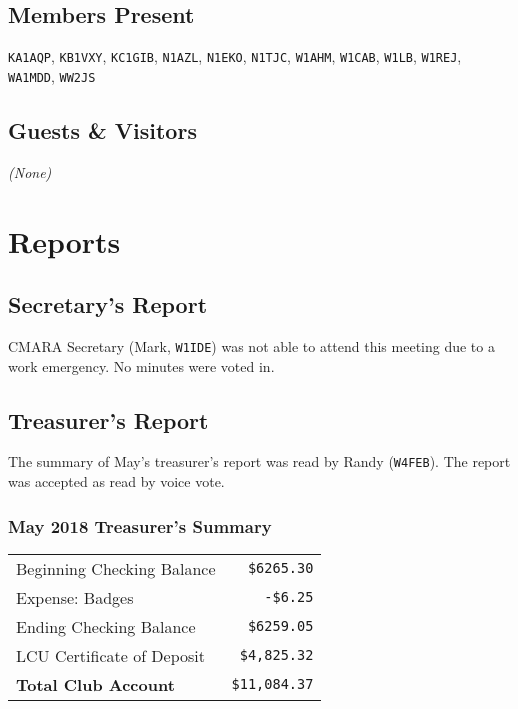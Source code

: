 \documentclass[10pt,letterpaper]{article}
\begin{document}
\subsection{Members Present}
\texttt{KA1AQP},
\texttt{KB1VXY},
\texttt{KC1GIB},
\texttt{N1AZL},
\texttt{N1EKO},
\texttt{N1TJC},
\texttt{W1AHM},
\texttt{W1CAB},
\texttt{W1LB},
\texttt{W1REJ},
\texttt{WA1MDD},
\texttt{WW2JS}

\subsection{Guests \& Visitors}
\emph{(None)}


\section{Reports}

\subsection{Secretary's Report}
CMARA Secretary (Mark, \texttt{W1IDE}) was not able to attend this meeting due to a work emergency. No minutes were voted in.

\newpage
\subsection{Treasurer's Report}
The summary of May's treasurer's report was read by Randy (\texttt{W4FEB}). The report was accepted as read by voice vote.

\subsubsection{May 2018 Treasurer's Summary}
\noindent
\begin{tabular}{|l|r|}
  \hline
  Beginning Checking Balance & \texttt{\$6265.30} \\
  Expense: Badges & \texttt{-\$6.25} \\
  Ending Checking Balance & \texttt{\$6259.05} \\
  \hline
  \hline
  LCU Certificate of Deposit & \texttt{\$4,825.32} \\
  \hline
  \hline
  \textbf{Total Club Account} & \texttt{\$11,084.37} \\
  \hline
\end{tabular}
\end{document}
